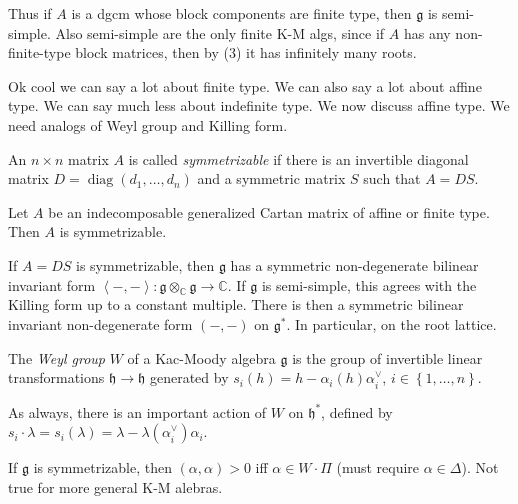 \documentclass[11pt, letterpaper]{article}
\theoremstyle{plain}
\begin{document}
Thus if $A$ is a dgcm whose block components are finite type, then $\mathfrak{g} $ is semi-simple. Also semi-simple are the only finite K-M algs, since if $A$ has any non-finite-type block matrices, then by (3) it has infinitely many roots.

Ok cool we can say a lot about finite type. We can also say a lot about affine type. We can say much less about indefinite type. We now discuss affine type. We need analogs of Weyl group and Killing form.

\begin{definition}\label{dfn:6-13}
	An $n\times n$ matrix $A$ is called \emph{symmetrizable} if there is an invertible diagonal matrix $D = \operatorname{diag} (d _1, \ldots ,d_n)$ and a symmetric matrix $S$ such that $A = DS$.
\end{definition}

\begin{proposition}\label{prp:6-14}
	Let $A$ be an indecomposable generalized Cartan matrix of affine or finite type. Then $A$ is symmetrizable.
\end{proposition}

\begin{proposition}\label{prp:6-15}
	If $A = DS$ is symmetrizable, then $\mathfrak{g} $ has a symmetric non-degenerate bilinear invariant form $\left\langle -,- \right\rangle : \mathfrak{g} \otimes _\mathbb{C} \mathfrak{g}  \to \mathbb{C} $. If $\mathfrak{g} $ is semi-simple, this agrees with the Killing form up to a constant multiple. There is then a symmetric bilinear invariant non-degenerate form $(-,-)$ on $\mathfrak{g} ^*$. In particular, on the root lattice.
\end{proposition}


\begin{definition}\label{dfn:6-16}
	The \emph{Weyl group} $W$ of a Kac-Moody algebra $\mathfrak{g} $ is the group of invertible linear transformations $\mathfrak{h} \to \mathfrak{h} $ generated by $s_i(h) = h - \alpha _i(h)\alpha ^\vee _i$, $i\in \left\{ 1, \ldots ,n \right\} $.
\end{definition}

As always, there is an important action of $W$ on $\mathfrak{h} ^*$, defined by $s_i\cdot \lambda = s_i(\lambda ) = \lambda -\lambda (\alpha _i^\vee )\alpha_i$.

If $\mathfrak{g} $ is symmetrizable, then $(\alpha ,\alpha )>0$ iff $\alpha \in W\cdot \Pi $ (must require $\alpha \in \Delta $). Not true for more general K-M alebras.
\end{document}
